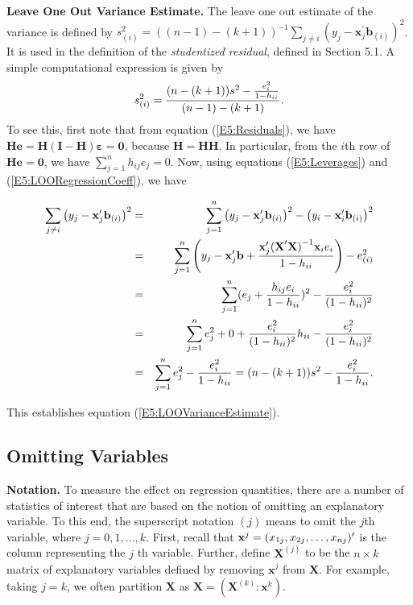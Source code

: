\textbf{Leave One Out Variance Estimate.} The leave one out estimate
of the variance is defined by
$s_{(i)}^{2}=((n-1)-(k+1))^{-1}\sum_{j\neq i}\left(
y_{j}-\mathbf{x}_{j}^{\prime }\mathbf{b}_{(i)}\right) ^{2}$. It is
used in the definition of the \textit{studentized residual}, defined
in Section 5.1. A simple computational expression is given by
\begin{equation}\label{E5:LOOVarianceEstimate}
s_{(i)}^{2}=\frac{(n-(k+1))s^{2}-\frac{e_{i}^{2}}{1-h_{ii}}}{%
(n-1)-(k+1)}.
\end{equation}
To see this, first note that from equation (\ref{E5:Residuals}), we have $\mathbf{He%
}=\mathbf{H(I-H)\boldsymbol \varepsilon}=\mathbf{0}$, because
$\mathbf{H}=\mathbf{HH}$. In
particular, from the $i$th row of $\mathbf{He}=\mathbf{0}$, we have $%
\sum_{j=1}^{n}h_{ij}e_{j}=0$. Now, using equations
(\ref{E5:Leverages}) and (\ref{E5:LOORegressionCoeff}), we have

\begin{center}
\begin{eqnarray*}
\sum_{j\neq i}\left( y_{j}-\mathbf{x}_{j}^{\prime }\mathbf{b}_{(i)}\right)
^{2} &=&\sum_{j=1}^{n}\left( y_{j}-\mathbf{x}_{j}^{\prime }\mathbf{b}%
_{(i)}\right) ^{2}-\left( y_{i}-\mathbf{x}_{i}^{\prime }\mathbf{b}%
_{(i)}\right) ^{2} \\
&=&\sum_{j=1}^{n}\left( y_{j}-\mathbf{x}_{j}^{\prime }\mathbf{b}+\frac{%
\mathbf{x}_{j}^{\prime }\mathbf{(X}^{\prime }\mathbf{X)}^{-1}\mathbf{x}_{i}%
e_{i}}{1-h_{ii}}\right) -e_{(i)}^{2} \\
&=&\sum_{j=1}^{n}(e_{j}+\frac{h_{ij}e_{i}}{1-h_{ii}})^{2}-\frac{%
e_{i}^{2}}{(1-h_{ii})^{2}} \\
&=&\sum_{j=1}^{n}e_{j}^{2}+0+\frac{e_{i}^{2}}{(1-h_{ii})^{2}}%
h_{ii}-\frac{e_{i}^{2}}{(1-h_{ii})^{2}} \\
&=&\sum_{j=1}^{n}e_{j}^{2}-\frac{e_{i}^{2}}{1-h_{ii}}%
=(n-(k+1))s^{2}-\frac{e_{i}^{2}}{1-h_{ii}}.
\end{eqnarray*}%
\qquad
\end{center}

This establishes equation (\ref{E5:LOOVarianceEstimate}).

\subsection{Omitting Variables}

\textbf{Notation.} To measure the effect on regression quantities, there are
a number of statistics of interest that are based on the notion of omitting
an explanatory variable. To this end, the superscript notation $(j)$ means
to omit the $j$th variable, where $j=0,1,...,k$. First, recall that $\mathbf{%
x}^{j}=(x_{1j},x_{2j},\ldots,x_{nj})^{\prime }$ is the column representing the $j$%
th variable. Further, define $\mathbf{X}^{(j)}$ to be the $n\times k$ matrix
of explanatory variables defined by removing $\mathbf{x}^{j}$ from $\mathbf{X%
}$. For example, taking $j=k$, we often partition $\mathbf{X}$ as $\mathbf{X}%
=\left( \mathbf{X}^{(k)}: \mathbf{x}^k \right) $.


